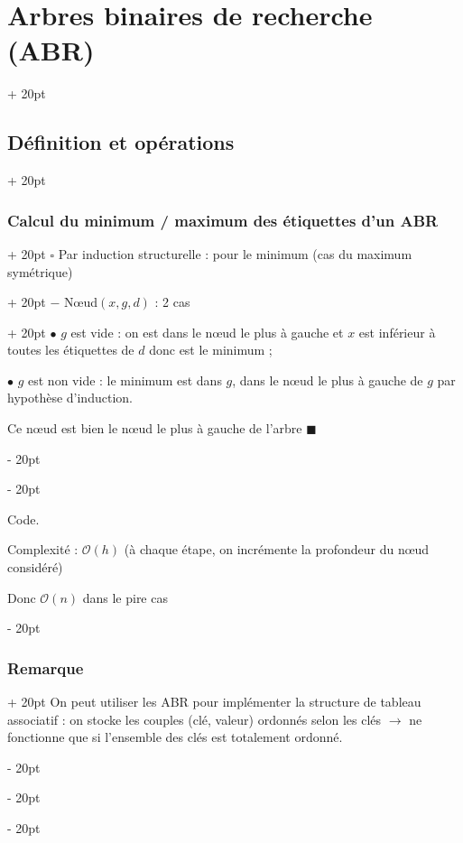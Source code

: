 \documentclass[a4paper, 12pt, twoside]{article}
\newcommand{\ind}[1][20pt]{\advance\leftskip + #1}
\newcommand{\deind}[1][20pt]{\advance\leftskip - #1}
\newenvironment{indt}[2][20pt]{#2 \par \ind[#1]}{\par \deind} %
\begin{document}
\begin{indt}{\section{Arbres binaires de recherche (ABR)}}
\begin{indt}{\subsection{Définition et opérations}}
\begin{indt}{\subsubsection{Calcul du minimum / maximum des étiquettes d'un ABR}}
\begin{indt}{$\square$ Par induction structurelle : pour le minimum (cas du maximum symétrique)}
                    \begin{indt}{$-$ N\oe ud$(x, g, d)$ : 2 cas}
                        $\bullet$ $g$ est vide : on est dans le n\oe ud le plus à gauche et $x$ est inférieur à toutes les étiquettes de $d$ donc est le minimum ;
                        
                        $\bullet$ $g$ est non vide : le minimum est dans $g$, dans le n\oe ud le plus à gauche de $g$ par hypothèse d'induction.
                        
                        Ce n\oe ud est bien le n\oe ud le plus à gauche de l'arbre $\blacksquare$
                    \end{indt}
                \end{indt}
                
                \vspace{12pt}
                
                 Code.
                
                \vspace{12pt}
                
                Complexité : $\mathcal O(h)$ (à chaque étape, on incrémente la profondeur du n\oe ud considéré)
                
                Donc $\mathcal O(n)$ dans le pire cas
                
                \begin{center}
                \end{center}
            \end{indt}
            
            \vspace{12pt}
            
            \begin{indt}{\subsubsection{Remarque}}
                On peut utiliser les ABR pour implémenter la structure de tableau associatif : on stocke les couples (clé, valeur) ordonnés selon les clés $\rightarrow$ ne fonctionne que si l'ensemble des clés est totalement ordonné.
            \end{indt}
            

\end{indt}
\end{indt}
\end{document}
